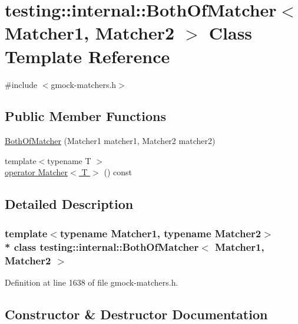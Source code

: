 \hypertarget{classtesting_1_1internal_1_1_both_of_matcher}{}\section{testing\+:\+:internal\+:\+:Both\+Of\+Matcher$<$ Matcher1, Matcher2 $>$ Class Template Reference}
\label{classtesting_1_1internal_1_1_both_of_matcher}


{\ttfamily \#include $<$gmock-\/matchers.\+h$>$}

\subsection*{Public Member Functions}
\begin{DoxyCompactItemize}
\item 
\hyperlink{classtesting_1_1internal_1_1_both_of_matcher_ab7941deda1965521f72d58b0dd429d6a}{Both\+Of\+Matcher} (Matcher1 matcher1, Matcher2 matcher2)
\item 
{\footnotesize template$<$typename T $>$ }\\\hyperlink{classtesting_1_1internal_1_1_both_of_matcher_aac6e941d3c89462183f24b974d4d7ca8}{operator Matcher$<$ T $>$} () const 
\end{DoxyCompactItemize}


\subsection{Detailed Description}
\subsubsection*{template$<$typename Matcher1, typename Matcher2$>$\\*
class testing\+::internal\+::\+Both\+Of\+Matcher$<$ Matcher1, Matcher2 $>$}



Definition at line 1638 of file gmock-\/matchers.\+h.



\subsection{Constructor \& Destructor Documentation}
